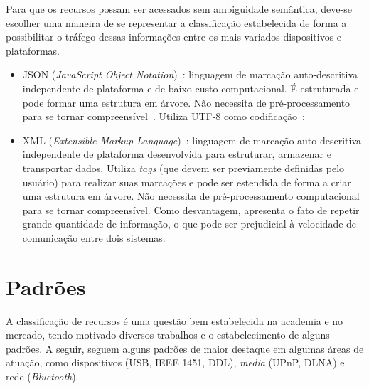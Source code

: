 Para que os recursos possam ser acessados sem ambiguidade semântica, deve-se escolher uma maneira de se representar a classificação estabelecida de forma a possibilitar o tráfego dessas informações entre os mais variados dispositivos e plataformas.

\begin{itemize}

	\item JSON (\emph{JavaScript Object Notation})~\cite{json}: linguagem de marcação auto-descritiva independente de plataforma e de baixo custo computacional. É estruturada e pode formar uma estrutura em árvore. Não necessita de pré-processamento para se tornar compreensível~\cite{comparativojson}. Utiliza UTF-8 como codificação~\cite{utf8};
	

	\item XML (\emph{Extensible Markup Language})~\cite{xml}: linguagem de marcação auto-descritiva independente de plataforma desenvolvida para estruturar, armazenar e transportar dados. Utiliza \emph{tags} (que devem ser previamente definidas pelo usuário) para realizar suas marcações e pode ser estendida de forma a criar uma estrutura em árvore. Não necessita de pré-processamento computacional para se tornar compreensível. Como desvantagem, apresenta o fato de repetir grande quantidade de informação, o que pode ser prejudicial à velocidade de comunicação entre dois sistemas.
\end{itemize}

\section{Padrões}
\label{sec:padroes}

A classificação de recursos é uma questão bem estabelecida na academia e no mercado, tendo motivado diversos trabalhos e o estabelecimento de alguns padrões. A seguir, seguem alguns padrões de maior destaque em algumas áreas de atuação, como dispositivos (USB, IEEE 1451, DDL), \emph{media} (UPnP, DLNA) e rede (\emph{Bluetooth}).

